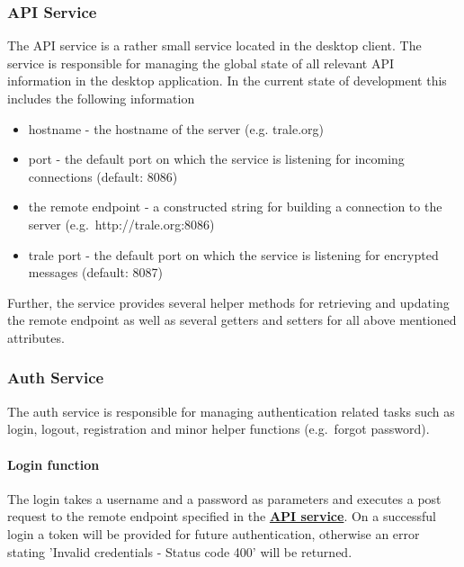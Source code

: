 \subsubsection{API Service}\label{subsubsec:api-service}

The API service is a rather small service located in the desktop client.
The service is responsible for managing the global state of all relevant API information in the desktop application.
In the current state of development this includes the following information

\begin{itemize}
    \item hostname - the hostname of the server (e.g. trale.org)
    \item port - the default port on which the service is listening for incoming connections (default: 8086)
    \item the remote endpoint - a constructed string for building a connection to the server (e.g.\ http://trale.org:8086)
    \item trale port - the default port on which the service is listening for encrypted messages (default: 8087)
\end{itemize}

Further, the service provides several helper methods for retrieving and updating the remote endpoint as well as several
getters and setters for all above mentioned attributes.

\subsubsection{Auth Service}\label{subsubsec:auth-service}
The auth service is responsible for managing authentication related tasks such as login, logout, registration and
minor helper functions (e.g.\ forgot password).

\paragraph{Login function}
The login takes a username and a password as parameters and executes a post request to the remote endpoint specified in
the \textbf{\hyperref[subsubsec:api-service]{API service}}.
On a successful login a token will be provided for future authentication, otherwise an error stating 'Invalid
credentials - Status code 400' will be returned.


